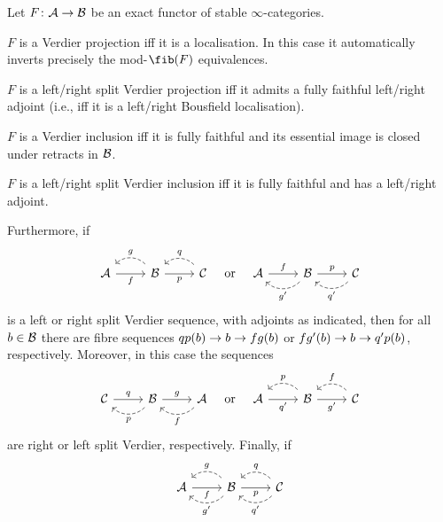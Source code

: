 \documentclass[a4paper, 10pt, oneside, DIV=9, chapterprefix=true, numbers=enddot,bibliography=totoc]{scrbook}
\newcommand{\embrace}[1]{\textup{(}#1\textup{)}}
\begin{document}
\begin{thm}\label{thm:VerdierStuff}
	Let $F\colon \Aa\morphism\Bb$ be an exact functor of stable $\infty$-categories.
	\begin{alphanumerate}
		\item $F$ is a Verdier projection iff it is a localisation. In this case it automatically inverts precisely the mod-$\fib(F)$ equivalences.
		\item $F$ is a left/right split Verdier projection iff it admits a fully faithful left/right adjoint \embrace{i.e., iff it is a left/right Bousfield localisation}.
		\item $F$ is a Verdier inclusion iff it is fully faithful and its essential image is closed under retracts in $\mathcal{B}$.
		\item $F$ is a left/right split Verdier inclusion iff it is fully faithful and has a left/right adjoint.
	\end{alphanumerate}
	Furthermore, if 
	\begin{equation*}
		\begin{tikzcd}
			\Aa\rar["f"'] & \Bb\rar["p"']\lar[dashed,bend right=45,"g"'] & \Cc\lar[dashed,bend right=45,"q"']
		\end{tikzcd}\quad\text{or}\quad \begin{tikzcd}
		\Aa\rar["f"] & \Bb\rar["p"]\lar[dashed,bend left=45,"g'"] & \Cc\lar[dashed,bend left=45,"q'"]
	\end{tikzcd}
	\end{equation*}
	is a left or right split Verdier sequence, with adjoints as indicated, then for all $b\in \mathcal{B}$ there are fibre sequences $qp(b)\morphism b\morphism fg(b)$ or $fg'(b)\morphism b\morphism q'p(b)$, respectively. Moreover, in this case the sequences
	\begin{equation*}
		\begin{tikzcd}
			\Cc\rar["q"] & \Bb\rar["g"]\lar[dashed,bend left=45,"p"] & \Aa\lar[dashed,bend left=45,"f"]
		\end{tikzcd}\quad\text{or}\quad \begin{tikzcd}
		\Aa\rar["q'"'] & \Bb\rar["g'"']\lar[dashed,bend right=45,"p"'] & \Cc\lar[dashed,bend right=45,"f"']
	\end{tikzcd}
	\end{equation*}
	are right or left split Verdier, respectively. Finally, if
	\begin{equation*}
		\begin{tikzcd}
			\Aa\rar["f"'] & \Bb\rar["p"']\lar[dashed,bend right=45,"g"']\lar[dashed,bend left=45,"g'"] & \Cc\lar[dashed,bend right=45,"q"']\lar[dashed,bend left=45,"q'"]

\end{tikzcd}
\end{equation*}
\end{thm}
\end{document}
